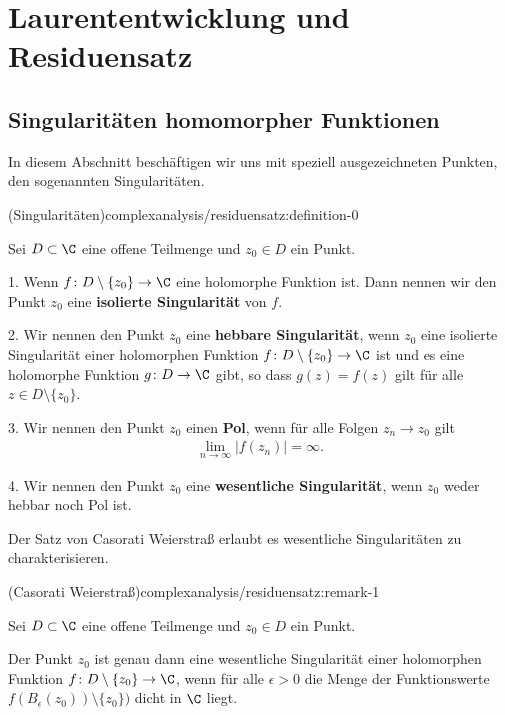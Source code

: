 \documentclass[letterpaper,10pt,german]{jupyterBook}
\begin{document}
\section{Laurententwicklung und Residuensatz}
\label{\detokenize{complexanalysis/residuensatz:laurententwicklung-und-residuensatz}}\label{\detokenize{complexanalysis/residuensatz::doc}}

\subsection{Singularitäten homomorpher Funktionen}
\label{\detokenize{complexanalysis/residuensatz:singularitaten-homomorpher-funktionen}}
\par
In diesem Abschnitt beschäftigen wir uns mit speziell ausgezeichneten Punkten, den sogenannten Singularitäten.
\begin{definition}{(Singularitäten)}{complexanalysis/residuensatz:definition-0}



\par
Sei \(D \subset \C\) eine offene Teilmenge und \(z_0 \in D\) ein Punkt.

\par
1. Wenn \(f \colon D \setminus \{z_0\} \rightarrow \C\) eine holomorphe Funktion ist.
Dann nennen wir den Punkt \(z_0\) eine \textbf{isolierte Singularität} von \(f\).

\par
2. Wir nennen den Punkt \(z_0\) eine \textbf{hebbare Singularität}, wenn \(z_0\) eine isolierte Singularität einer holomorphen Funktion \(f \colon D \setminus \{z_0\} \rightarrow \C\) ist und es eine holomorphe Funktion \(g \colon D \rightarrow \C\) gibt, so dass \(g(z) = f(z)\) gilt für alle \(z \in D \setminus \{z_0\}\).

\par
3. Wir nennen den Punkt \(z_0\) einen \textbf{Pol}, wenn für alle Folgen \(z_n \rightarrow z_0\) gilt
\begin{align*}
\lim_{n\rightarrow \infty} |f(z_n)| = \infty.
\end{align*}
\par
4. Wir nennen den Punkt \(z_0\) eine \textbf{wesentliche Singularität}, wenn \(z_0\) weder hebbar noch Pol ist.
\end{definition}

\par
Der Satz von Casorati Weierstraß erlaubt es wesentliche Singularitäten zu charakterisieren.
\begin{remark}{(Casorati Weierstraß)}{complexanalysis/residuensatz:remark-1}



\par
Sei \(D \subset \C\) eine offene Teilmenge und \(z_0 \in D\) ein Punkt.

\par
Der Punkt \(z_0\) ist genau dann eine wesentliche Singularität einer holomorphen Funktion \(f \colon D \setminus \{z_0\} \rightarrow \C\), wenn für alle \(\epsilon > 0\) die Menge der Funktionswerte \(f(B_\epsilon(z_0)) \setminus \{z_0\})\) dicht in \(\C\) liegt.
\end{remark}
\end{document}
